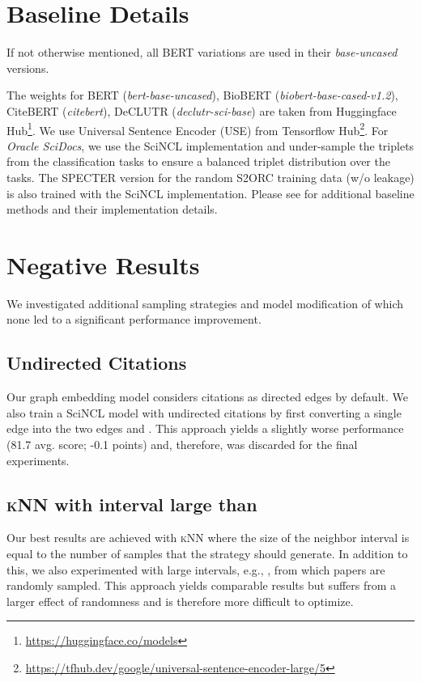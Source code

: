\documentclass[11pt]{article}
\newcommand{\knn}{\textsc{kNN}\xspace}
\newcommand{\sys}{SciNCL\xspace} \newcommand{\baselineCount}{10\xspace}
\newcommand{\oracle}{\textit{Oracle SciDocs}\xspace}
\begin{document}
\section{Baseline Details} \label{ssec:baseline-details}

If not otherwise mentioned, all BERT variations are used in their \textit{base-uncased} versions.

The weights for BERT (\textit{bert-base-uncased}), BioBERT (\textit{biobert-base-cased-v1.2}), CiteBERT (\textit{citebert}), DeCLUTR (\textit{declutr-sci-base}) are taken from Huggingface Hub\footnote{\url{https://huggingface.co/models}}.
We use Universal Sentence Encoder (USE) from Tensorflow Hub\footnote{\url{https://tfhub.dev/google/universal-sentence-encoder-large/5}}.
For \oracle, we use the SciNCL implementation and under-sample the triplets from the classification tasks to ensure a balanced triplet distribution over the tasks.
The SPECTER version for the random S2ORC training data (w/o leakage) is also trained with the SciNCL implementation.
Please see \citet{Cohan2020} for additional baseline methods and their implementation details.

\section{Negative Results} \label{ssec:negative-results}
We investigated additional sampling strategies and model modification of which none led to a significant performance improvement.


\subsection{Undirected Citations} \label{sssec:undirected-citations}
Our graph embedding model considers citations as directed edges by default.
We also train a \sys model with undirected citations by first converting a single edge  into the two edges  and .
This approach yields a slightly worse performance (81.7 avg. score; -0.1 points) and, therefore, was discarded for the final experiments.

\subsection{\knn with interval large than }
Our best results are achieved with \knn where the size of the neighbor interval  is equal to the number of samples  that the strategy should generate.
In addition to this, we also experimented with large intervals, e.g., , from which  papers are randomly sampled.
This approach yields comparable results but suffers from a larger effect of randomness and is therefore more difficult to optimize.
\end{document}
